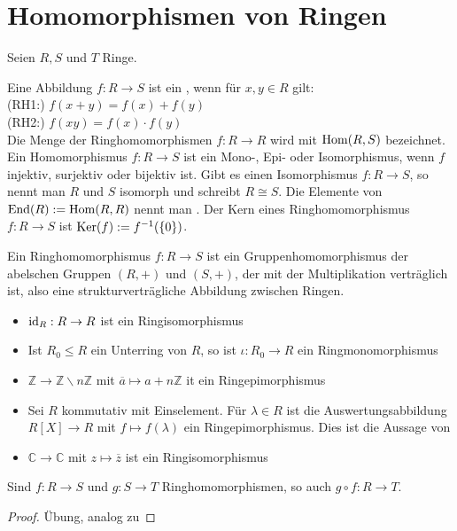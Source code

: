 \section{Homomorphismen von Ringen}

Seien $R,S$ und $T$ Ringe.

\begin{definition}[Ringhomomorphismus]
	Eine Abbildung $f:R\to S$ ist ein , wenn für $x,y\in R$ 
	gilt: \\
	(RH1:) $f(x+y)=f(x)+f(y)$ \\
	(RH2:) $f(xy)=f(x)\cdot f(y)$ \\
	Die Menge der Ringhomomorphismen $f:R\to R$ wird mit $\operatorname{Hom}(R,S)$ bezeichnet. Ein Homomorphismus $f:R\to S$ ist ein 
	Mono-, Epi- oder Isomorphismus, wenn $f$ injektiv, surjektiv oder bijektiv ist. Gibt es einen Isomorphismus 
	$f:R\to S$, so nennt man $R$ und $S$ isomorph und schreibt $R\cong S$. Die Elemente von $\operatorname{End}(R):= \operatorname{Hom}(R,R)$ nennt 
	man . Der Kern eines Ringhomomorphismus $f:R\to S$ ist $\operatorname{Ker}(f):= f^{-1}(\{0\})$.
\end{definition}

\begin{remark}
	Ein Ringhomomorphismus $f:R\to S$ ist ein Gruppenhomomorphismus der abelschen Gruppen $(R,+)$ und 
	$(S,+)$, der mit der Multiplikation verträglich ist, also eine strukturverträgliche Abbildung zwischen Ringen.
\end{remark}

\begin{example}
	\begin{itemize}
		\item $\operatorname{id}_R:R\to R$ ist ein Ringisomorphismus
		\item Ist $R_0\le R$ ein Unterring von $R$, so ist $\iota: R_0 \to R$ ein Ringmonomorphismus
		\item $\mathbb Z \to \mathbb Z\backslash n\mathbb Z$ mit $\overline a\mapsto a+n\mathbb Z$ it ein Ringepimorphismus
		\item Sei $R$ kommutativ mit Einselement. Für $\lambda\in R$ ist die Auswertungsabbildung $R[X]\to R$ mit $f\mapsto 
		f(\lambda)$ ein Ringepimorphismus. Dies ist die Aussage von 
		\item $\mathbb C \to \mathbb C$ mit $z\mapsto \overline z$ ist ein Ringisomorphismus
	\end{itemize}
\end{example}

\begin{proposition}
	Sind $f:R\to S$ und $g:S\to T$ Ringhomomorphismen, so auch $g\circ f:R\to T$.
\end{proposition}
\begin{proof}
	Übung, analog zu 
\end{proof}

